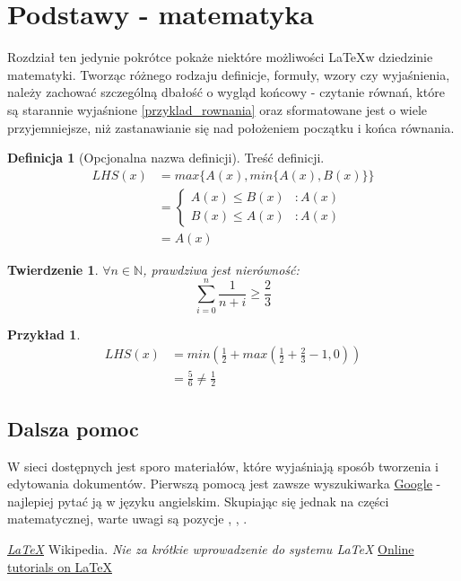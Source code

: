 \documentclass[11pt]{article} %
\newtheorem{theorem}{Twierdzenie}[section]
\theoremstyle{definition}
\newtheorem{definition}{Definicja}[section]
\newtheorem{example}{Przykład}[section]
\theoremstyle{remark}
\begin{document}
\section{Podstawy - matematyka}
Rozdział ten jedynie pokrótce pokaże niektóre możliwości \LaTeX w dziedzinie matematyki. Tworząc różnego rodzaju definicje, formuły, wzory czy wyjaśnienia, należy zachować szczególną dbałość o wygląd końcowy - czytanie równań, które są starannie wyjaśnione \ref{przyklad_rownania} oraz sformatowane jest o wiele przyjemniejsze, niż zastanawianie się nad położeniem początku i końca równania.

\begin{definition}[Opcjonalna nazwa definicji]
Treść definicji.
\begin{equation} \label{przyklad_rownania}
\begin{split}
LHS(x) & = max\{ A(x), min\{A(x), B(x) \} \} \\
 & = \begin{cases}
 			A(x) \le B(x)&: A(x) \\
 			B(x) \le A(x)&: A(x)
 		\end{cases} \\
 & = A(x)
\end{split}
\end{equation}
\end{definition}

\begin{theorem}
$\forall n\in \mathbb{N}$, prawdziwa jest nierówność:
\[
\sum^{n}_{i=0} \frac{1}{n+i} \ge \frac{2}{3}
\]
\end{theorem}
\begin{example}
\begin{equation}
\begin{split}
LHS(x) &= min\left(\frac{1}{2} + max\left(\frac{1}{2}+\frac{2}{3}-1,0\right)\right) \\
	&=\frac{5}{6}\ne \frac{1}{2}
\end{split}
\end{equation}
\end{example}
\subsection{Dalsza pomoc}
W sieci dostępnych jest sporo materiałów, które wyjaśniają sposób tworzenia i edytowania dokumentów. Pierwszą pomocą jest zawsze wyszukiwarka \href{http://google.pl}{Google} - najlepiej pytać ją w języku angielskim. Skupiając się jednak na części matematycznej, warte uwagi są pozycje \cite{sharelatex}, \cite{online_tutorial}, \cite{wikibooks_mathematics}.
\begin{thebibliography}{1}

	 {\em \href{http://pl.wikipedia.org/wiki/LaTeX}{LaTeX}} Wikipedia.
	 {\em Nie za krótkie wprowadzenie do systemu \LaTeX}
	 { \href{http://www.tug.org.in/tutorials.html}{Online tutorials on \LaTeX}}
\end{thebibliography}
\end{document}
